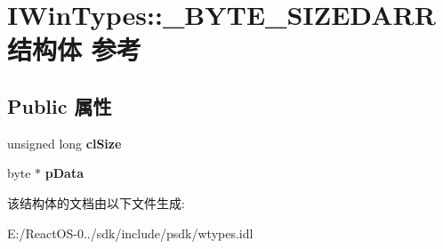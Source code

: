 \hypertarget{struct_i_win_types_1_1___b_y_t_e___s_i_z_e_d_a_r_r}{}\section{I\+Win\+Types\+:\+:\+\_\+\+B\+Y\+T\+E\+\_\+\+S\+I\+Z\+E\+D\+A\+R\+R结构体 参考}
\label{struct_i_win_types_1_1___b_y_t_e___s_i_z_e_d_a_r_r}
\subsection*{Public 属性}
\begin{DoxyCompactItemize}
\item 
\mbox{\label{struct_i_win_types_1_1___b_y_t_e___s_i_z_e_d_a_r_r_a0e31991ee3f8a1f5d04cf87e8fa8f14d}} 
unsigned long {\bfseries cl\+Size}
\item 
\mbox{\label{struct_i_win_types_1_1___b_y_t_e___s_i_z_e_d_a_r_r_a2a4f3c7042ab3899c2d7f47d8a2b5c5a}} 
byte $\ast$ {\bfseries p\+Data}
\end{DoxyCompactItemize}


该结构体的文档由以下文件生成\+:\begin{DoxyCompactItemize}
\item 
E\+:/\+React\+O\+S-\/0../sdk/include/psdk/wtypes.\+idl\end{DoxyCompactItemize}
